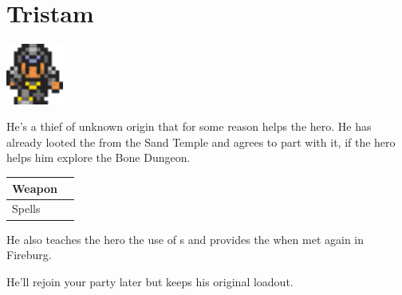 \section{Tristam}
\label{char:tristam}

\includegraphics[height=2cm,keepaspectratio]{./resources/chars/tristam}

He’s a thief of unknown origin that for some reason helps the hero. He has already looted the  from the Sand Temple and agrees to part with it, if the hero helps him explore the Bone Dungeon.

\vspace{0.5em}
\begin{tabular}{ l | l }
	Weapon & \nameref{weapon:ninja_stars} \\
	\hline
	Spells & \nameref{spell:life}
\end{tabular}
\vspace{0.5em}

He also teaches the hero the use of s and provides the  when met again in Fireburg.

\vspace{1em}

He’ll rejoin your party later but keeps his original loadout. 
